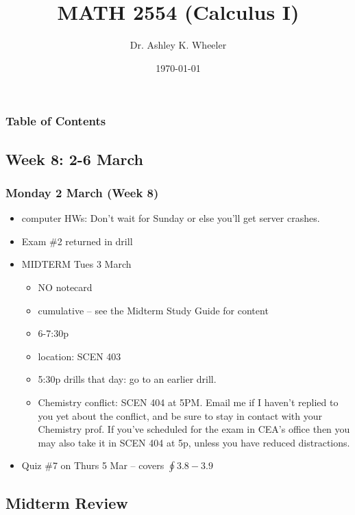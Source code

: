 \documentclass[14pt]{beamer}
\title[Cal I S2015]{MATH 2554 (Calculus I)}
\subtitle{}
\author[Wheeler]{Dr. Ashley K. Wheeler}
\institute{University of Arkansas}
\date{\today}
\begin{document}
\maketitle

\begin{frame}
\frametitle{Table of Contents}
\tableofcontents
\end{frame}


\begin{frame}
\section[Week 8]{Week 8: 2-6 March}
\frametitle{Monday 2 March (Week 8)}
\footnotesize
\begin{itemize}
\item computer HWs: Don't wait for Sunday or else you'll get server crashes.
\item Exam \#2 returned in drill
\item MIDTERM Tues 3 March
	\begin{itemize}
	\footnotesize
	\item NO notecard
	\item cumulative -- see the Midterm Study Guide for content 
	\item 6-7:30p
	\item location: SCEN 403
	\item 5:30p drills that day: go to an earlier drill.
	\item Chemistry conflict: SCEN 404 at \alert{5PM}.  Email me if I haven't replied to you yet about the conflict, and be sure to stay in contact with your Chemistry prof.  If you've scheduled for the exam in CEA's office then you may also take it in SCEN 404 at 5p, unless you have reduced distractions.  
	\end{itemize}
\item Quiz \#7 on Thurs 5 Mar -- covers $\oint 3.8-3.9$	
\end{itemize}
\end{frame}

\subsection{Midterm Review}
\end{document}

